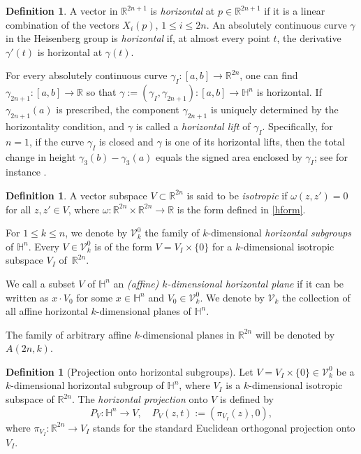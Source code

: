 \documentclass[12pt]{amsart}
\newcommand{\R}{\mathbb R}
\renewcommand{\H}{\mathbb H}
\numberwithin{equation}{section}
\theoremstyle{plain}
\theoremstyle{definition}
\newtheorem{definition}[theorem]{Definition}
\theoremstyle{remark}
\begin{document}
\begin{definition}\label{d:horiz}
A vector in $\mathbb{R}^{2n+1}$ is \emph{horizontal} at $p \in \mathbb{R}^{2n+1}$ if it is a linear combination of the vectors $X_{i}(p)$, $1\leq i\leq 2n$.
An absolutely continuous curve $\gamma$ in the Heisenberg group is \emph{horizontal} if, at almost every point $t$, the derivative $\gamma'(t)$ is horizontal at $\gamma(t)$.
\end{definition}
For every absolutely continuous curve $\gamma_I: [a,b]\to \mathbb{R}^{2n}$, one can find $\gamma_{2n+1}:[a,b]\to \mathbb{R}$ so that $\gamma:=(\gamma_I,\gamma_{2n+1}):[a,b]\to \mathbb{H}^n$ is horizontal. If  $\gamma_{2n+1}(a)$ is prescribed, the  component $\gamma_{2n+1}$
is uniquely determined by the horizontality condition, and $\gamma$ is called a \emph{horizontal lift} of $\gamma_I$.
Specifically, for $n=1$, if the curve $\gamma_I$ is closed and $\gamma$ is one of its horizontal lifts, then the total change in height $\gamma_3(b)-\gamma_3(a)$ equals the signed area enclosed by $\gamma_I$; see for instance \cite{CDPT}.
\begin{definition}\label{d;SubspaceDef}
A vector subspace $V\subset\R^{2n}$ is said to be \textit{isotropic} if $\omega(z,z')=0$ for all $z,z'\in V$, where $\omega:\R^{2n}\times\R^{2n}\to\R$ is the form defined in \eqref{hform}. 

For $1\leq k\leq n$, 
we denote by $\mathcal V_k^0$ the family of $k$-dimensional \emph{horizontal subgroups} of $\mathbb{H}^n$. Every $V\in \mathcal{V}_k^0$ is of the form $V=V_I \times \{0\}$ for a  $k$-dimensional isotropic subspace $V_I$  of~$\mathbb{R}^{2n}$.

We call a subset $V$ of $\mathbb{H}^n$ an \emph{(affine) $k$-dimensional horizontal plane} if it can be written as $x\cdot V_0$ for some $x\in \mathbb{H}^n$ and $V_0\in \mathcal V_k^0$. We denote by $\mathcal V_k$ the collection of all affine horizontal $k$-dimensional planes of $\mathbb{H}^n$.

The family of arbitrary affine $k$-dimensional planes in $\mathbb{R}^{2n}$ will be denoted by $A(2n,k)$.
\end{definition}

\begin{definition}[Projection onto horizontal subgroups]
Let $V=V_I\times\{0\}\in \mathcal V_k^0$ be a $k$-dimensional horizontal subgroup of $\H^n$, where $V_I$ is a $k$-dimensional isotropic subspace of $\R^{2n}$. The \textit{horizontal projection} onto $V$ is defined by 
\[P_V:\H^n\to V,\quad P_V(z,t):=(\pi_{V_I}(z),0),\]
where $\pi_{V_I}:\R^{2n}\to V_I$ stands for the standard Euclidean orthogonal projection onto $V_I$.
\end{definition}
\end{document}
